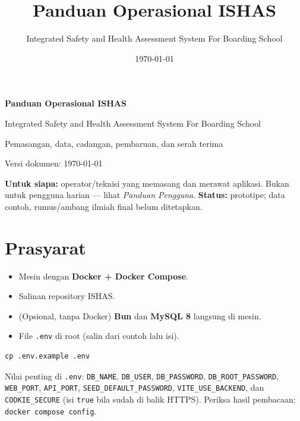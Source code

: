 \documentclass[11pt,a4paper]{article}
\title{\color{ishas}Panduan Operasional ISHAS}
\author{Integrated Safety and Health Assessment System For Boarding School}
\date{\today}
\newcommand{\code}[1]{\texttt{#1}}
\begin{document}
\begin{titlepage}
  \centering
  \vspace*{3cm}
  {\color{ishas}\Huge\bfseries Panduan Operasional ISHAS\par}
  \vspace{0.6cm}
  {\large Integrated Safety and Health Assessment System For Boarding School\par}
  \vspace{0.4cm}
  {\large Pemasangan, data, cadangan, pembaruan, dan serah terima\par}
  \vspace{2cm}
  {\large Versi dokumen: \today\par}
  \vfill
  \begin{minipage}{0.86\textwidth}
    \colorbox{ishaslight}{%
      \parbox{\dimexpr\linewidth-2\fboxsep}{%
        \textbf{Untuk siapa:} operator/teknisi yang memasang dan merawat aplikasi.
        Bukan untuk pengguna harian --- lihat \emph{Panduan Pengguna}.
        \textbf{Status:} prototipe; data contoh, rumus/ambang ilmiah final belum
        ditetapkan.%
      }%
    }
  \end{minipage}
  \vspace{1.2cm}
\end{titlepage}

\tableofcontents
\newpage

\section{Prasyarat}
\begin{itemize}
  \item Mesin dengan \textbf{Docker + Docker Compose}.
  \item Salinan repository ISHAS.
  \item (Opsional, tanpa Docker) \textbf{Bun} dan \textbf{MySQL 8} langsung di mesin.
  \item File \code{.env} di root (salin dari contoh lalu isi).
\end{itemize}

\begin{lstlisting}
cp .env.example .env
\end{lstlisting}

\noindent Nilai penting di \code{.env}: \code{DB_NAME}, \code{DB_USER},
\code{DB_PASSWORD}, \code{DB_ROOT_PASSWORD}, \code{WEB_PORT}, \code{API_PORT},
\code{SEED_DEFAULT_PASSWORD}, \code{VITE_USE_BACKEND}, dan \code{COOKIE_SECURE}
(isi \code{true} bila sudah di balik HTTPS). Periksa hasil pembacaan:
\code{docker compose config}.
\end{document}
